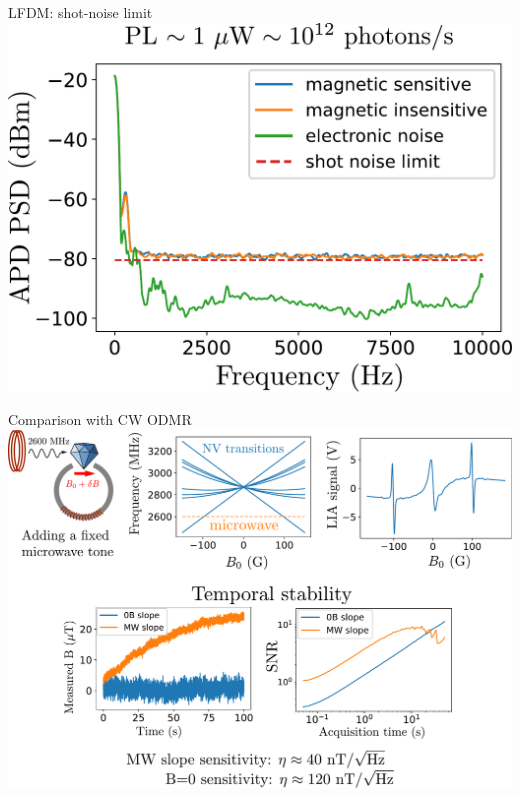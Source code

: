 \documentclass{beamer}
\begin{document}
\begin{frame}{LFDM: shot-noise limit}
\centering
\includegraphics[width=\textwidth,height=0.85\textheight,keepaspectratio]{Slide_bonus_shot_noise_limit}
\end{frame}

\begin{frame}{Comparison with CW ODMR}
\centering
\includegraphics[width=\textwidth,height=0.85\textheight,keepaspectratio]{Slide_comparison_microwave}
\end{frame}
\end{document}
